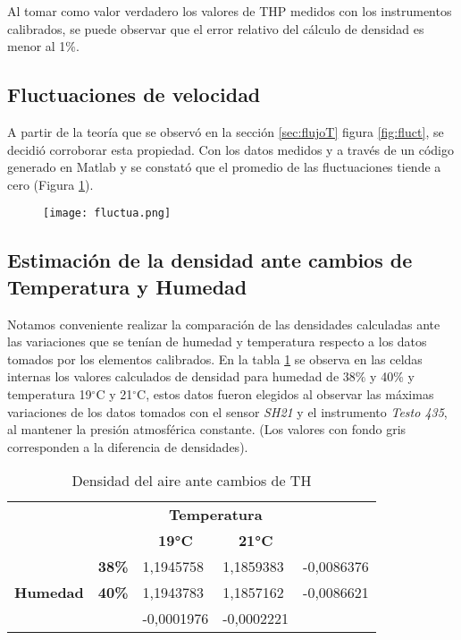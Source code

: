 Al tomar como valor verdadero los valores de THP medidos con los instrumentos calibrados, se puede observar que el error relativo del cálculo de densidad es menor al 1\%.

\subsection{Fluctuaciones de velocidad}
A partir de la teoría que se observó en la sección \ref{sec:flujoT} figura \ref{fig:fluct}, se decidió corroborar esta propiedad. Con los datos medidos y a través de un código generado en Matlab y se constató que el promedio de las fluctuaciones tiende a cero (Figura \ref{fig:fluct2}).
\begin{figure}[H]
	\centering
	\texttt{[image: fluctua.png]}
	\label{fig:fluct2}
\end{figure}


\subsection{Estimación de la densidad ante cambios de Temperatura y Humedad}
Notamos conveniente realizar la comparación de las densidades calculadas ante las variaciones que se tenían de humedad y temperatura respecto a los datos tomados por los elementos calibrados. En la tabla \ref{densTH} se observa en las celdas internas los valores calculados de densidad para humedad de 38$\%$ y 40$\%$ y temperatura 19$^{\circ}$C y 21$^{\circ}$C, estos datos fueron elegidos al observar las máximas variaciones de los datos tomados con el sensor \textit{SH21} y el instrumento \textit{Testo 435}, al mantener la presión atmosférica constante.
(Los valores con fondo gris corresponden a la diferencia de densidades).

\begin{table}[h!]
	\centering
	\begin{tabular}{lllll}
		&  & \multicolumn{2}{c}{\textbf{Temperatura}} &  \\
		&  & \multicolumn{1}{c}{\textbf{19°C}} & \multicolumn{1}{c}{\textbf{21°C}} & \multicolumn{1}{c}{\textbf{}} \\
		\multicolumn{1}{c}{} & \multicolumn{1}{r}{\textbf{38\%}} & 1,1945758 & 1,1859383 & \cellcolor[HTML]{F2F2F2}-0,0086376 \\
		\multicolumn{1}{c}{\multirow{-2}{*}{\textbf{Humedad}}} & \multicolumn{1}{r}{\textbf{40\%}} & 1,1943783 & 1,1857162 & \cellcolor[HTML]{F2F2F2}-0,0086621 \\
		& \multicolumn{1}{c}{\textbf{}} & \cellcolor[HTML]{F2F2F2}-0,0001976 & \cellcolor[HTML]{F2F2F2}-0,0002221 & 
	\end{tabular}
\caption{Densidad del aire ante cambios de TH}
\label{densTH}
\end{table}

